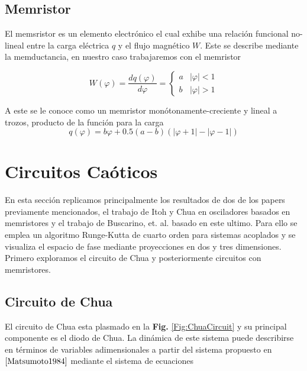 \documentclass[11pt,letterpaper]{article}
\begin{document}
\begin{multicols*}{2}
\subsection*{Memristor}

El memsristor es un elemento electrónico el cual exhibe una relación funcional no-lineal entre la carga eléctrica $q$ y el flujo magnético $W$. Este se describe mediante la memductancia, en nuestro caso trabajaremos con el memristor

\begin{equation}
    W (\varphi) = \frac{dq(\varphi)}{d\varphi} =
    \begin{cases}
        a & |\varphi| < 1 \\
        b & |\varphi| > 1
\end{cases}
\end{equation}

A este se le conoce como un memristor monótonamente-creciente y lineal a trozos, producto de la función para la carga
\begin{equation}
    q(\varphi) = b\varphi + 0.5(a-b)(|\varphi + 1| - |\varphi - 1|) 
\end{equation}


\section*{Circuitos Caóticos}

En esta sección replicamos principalmente los resultados de dos de los papers previamente mencionados, el trabajo de Itoh y Chua en osciladores basados en memristores \cite{Itoh2008} y el trabajo de Buscarino, et. al. \cite{Buscarino2012b} basado en este ultimo. Para ello se emplea un algoritmo Runge-Kutta de cuarto orden para sistemas acoplados y se visualiza el espacio de fase mediante proyecciones en dos y tres dimensiones. Primero exploramos el circuito de Chua y posteriormente circuitos con memristores.




\subsection*{Circuito de Chua}
El circuito de Chua esta plasmado en la \textbf{Fig.} \ref{Fig:ChuaCircuit} y su principal componente es el diodo de Chua. La dinámica de este sistema puede describirse en términos de variables adimensionales a partir del sistema propuesto en $\text{\cite{Matsumoto1984}}$ mediante el sistema de ecuaciones


\end{multicols*}
\end{document}
